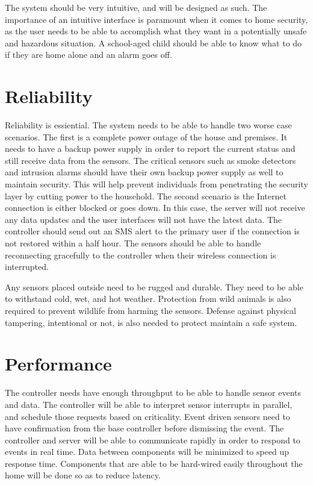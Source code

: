 \documentclass{report}
\begin{document}
The system should be very intuitive, and will be designed as such. The
importance of an intuitive interface is paramount when it comes to home
security, as the user needs to be able to accomplish what they want in a
potentially unsafe and hazardous situation. A school-aged child should be able to
know what to do if they are home alone and an alarm goes off.

\section{Reliability}
Reliability is essiential. The system needs to be able to handle two worse case
scenarios. The first is a complete power outage of the house and premises. It
needs to have a backup power supply in order to report the current status and
still receive data from the sensors. The critical sensors such as smoke
detectors and intrusion alarms should have their own backup power supply as
well to maintain security. This will help prevent individuals from penetrating
the security layer by cutting power to the household. The second scenario is
the Internet connection is either blocked or goes down. In this case, the
server will not receive any data updates and the user interfaces will not have
the latest data. The controller should send out an SMS alert to the primary
user if the connection is not restored within a half hour. The sensors should
be able to handle reconnecting gracefully to the controller when their wireless
connection is interrupted.

Any sensors placed outside need to be rugged and durable. They need to be able
to withstand cold, wet, and hot weather. Protection from wild animals is also
required to prevent wildlife from harming the sensors. Defense against physical
tampering, intentional or not, is also needed to protect maintain a safe
system.

\section{Performance}
The controller needs have enough throughput to be able to handle sensor events
and data. The controller will be able to interpret sensor interrupts in parallel, and 
schedule those requests based on criticality. Event driven sensors need to have
confirmation from the base controller before dismissing the event. The
controller and server will be able to communicate rapidly in order to respond
to events in real time. Data between components will be minimized to speed up
response time. Components that are able to be hard-wired easily throughout the
home will be done so as to reduce latency.
\end{document}
